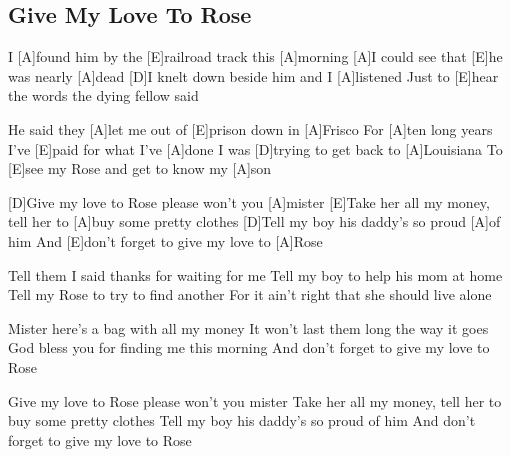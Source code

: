 \subsection*{Give My Love To Rose   }



\begin{guitar}

I [A]found him by the [E]railroad track this [A]morning
[A]I could see that [E]he was nearly [A]dead
[D]I knelt down beside him and I [A]listened
Just to [E]hear the words the dying fellow said

He said they [A]let me out of [E]prison down in [A]Frisco
For [A]ten long years I've [E]paid for what I've [A]done
I was [D]trying to get back to [A]Louisiana
To [E]see my Rose and get to know my [A]son


[D]Give my love to Rose please won't you [A]mister
[E]Take her all my money, tell her to [A]buy some pretty clothes
[D]Tell my boy his daddy's so proud [A]of him
And [E]don't forget to give my love to [A]Rose


Tell them I said thanks for waiting for me
Tell my boy to help his mom at home
Tell my Rose to try to find another
For it ain't right that she should live alone

Mister here's a bag with all my money
It won't last them long the way it goes
God bless you for finding me this morning
And don't forget to give my love to Rose

Give my love to Rose please won't you mister
Take her all my money, tell her to buy some pretty clothes
Tell my boy his daddy's so proud of him
And don't forget to give my love to Rose
\end{guitar}
